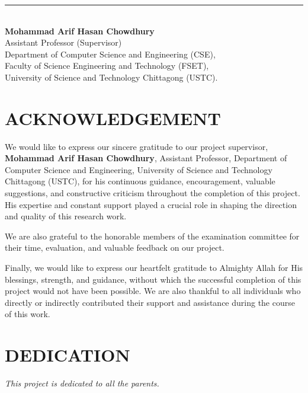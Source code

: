\documentclass[12pt, a4paper]{report}
\begin{document}
\vspace{1.5cm}
\noindent
\rule{8cm}{0.4pt} \\
\textbf{Mohammad Arif Hasan Chowdhury} \\
Assistant Professor (Supervisor) \\
Department of Computer Science and Engineering (CSE), \\
Faculty of Science Engineering and Technology (FSET), \\
University of Science and Technology Chittagong (USTC).

\chapter*{ACKNOWLEDGEMENT}
We would like to express our sincere gratitude to our project supervisor, \textbf{Mohammad Arif Hasan Chowdhury}, Assistant Professor, Department of Computer Science and Engineering, University of Science and Technology Chittagong (USTC), for his continuous guidance, encouragement, valuable suggestions, and constructive criticism throughout the completion of this project. His expertise and constant support played a crucial role in shaping the direction and quality of this research work.

We are also grateful to the honorable members of the examination committee for their time, evaluation, and valuable feedback on our project.

Finally, we would like to express our heartfelt gratitude to Almighty Allah for His blessings, strength, and guidance, without which the successful completion of this project would not have been possible. We are also thankful to all individuals who directly or indirectly contributed their support and assistance during the course of this work.

\chapter*{DEDICATION}
\begin{center}
\vspace*{3cm}
{\large \textit{This project is dedicated to all the parents.}}
\end{center}
\end{document}

